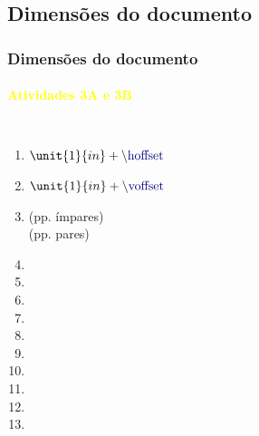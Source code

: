 \documentclass[handout,10pt]{beamer}
\begin{document}
\subsection{Dimensões do documento}
\begin{frame}
	\frametitle{Dimensões do documento}
	\framesubtitle{\textcolor{yellow}{Atividades 3A e 3B}}
	
	\begin{columns}
			\small
			\begin{enumerate}
			\item $\unit{1}{in} + \text{\cs{hoffset}}$
			\item $\unit{1}{in} + \text{\cs{voffset}}$
			\item {} {\scriptsize(pp. ímpares)}\\
			       {\scriptsize(pp. pares)}
			\item {}
			\item {}
			\item {}
			\item {}
			\item {}
			\item {}
			\item {}
			\item {}
			\item {}
			\item {}
			\end{enumerate}
			

\end{columns}
\end{frame}
\end{document}
